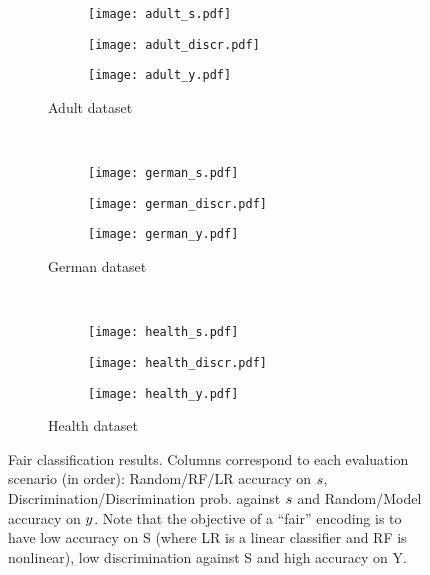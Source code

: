 \begin{figure}[ht]
   \centering
   \begin{subfigure}{\linewidth}
  \begin{subfigure}{.329\textwidth}
    \centering
        \texttt{[image: adult\_s.pdf]}
  \end{subfigure} \begin{subfigure}{.329\textwidth}
    \centering
        \texttt{[image: adult\_discr.pdf]}
  \end{subfigure} \begin{subfigure}{.329\textwidth}
    \centering
        \texttt{[image: adult\_y.pdf]}
  \end{subfigure}
  \caption{Adult dataset}
  \end{subfigure} \\
  \begin{subfigure}{\linewidth}
  \begin{subfigure}{.329\textwidth}
    \centering
        \texttt{[image: german\_s.pdf]}
  \end{subfigure}\begin{subfigure}{.329\textwidth}
    \centering
        \texttt{[image: german\_discr.pdf]}
  \end{subfigure}\begin{subfigure}{.329\textwidth}
    \centering
        \texttt{[image: german\_y.pdf]}
  \end{subfigure}
  \caption{German dataset}
  \end{subfigure}\\
  \begin{subfigure}{\linewidth}
  \begin{subfigure}{.329\textwidth}
      \centering
      \texttt{[image: health\_s.pdf]}
  \end{subfigure}\begin{subfigure}{.329\textwidth}
      \centering
      \texttt{[image: health\_discr.pdf]}
  \end{subfigure}\begin{subfigure}{.329\textwidth}
      \centering
      \texttt{[image: health\_y.pdf]}
  \end{subfigure}
  \caption{Health dataset}
  \end{subfigure}\caption{Fair classification results. Columns correspond to each evaluation scenario (in order): Random/RF/LR accuracy on $\*s$, Discrimination/Discrimination prob. against $\*s$ and Random/Model accuracy on $\*y$. Note that the objective of a ``fair'' encoding is to have low accuracy on S (where LR is a linear classifier and RF is nonlinear), low discrimination against S and high accuracy on Y.}
  \label{tab:fair_results}
\end{figure}


